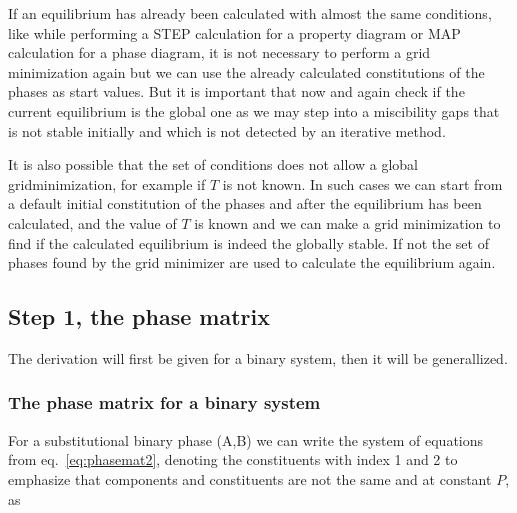 \documentclass[12pt]{article}
\begin{document}
If an equilibrium has already been calculated with almost the same
conditions, like while performing a STEP calculation for a property
diagram or MAP calculation for a phase diagram, it is not necessary to
perform a grid minimization again but we can use the already
calculated constitutions of the phases as start values.  But it is
important that now and again check if the current equilibrium is the
global one as we may step into a miscibility gaps that is not stable
initially and which is not detected by an iterative method.

It is also possible that the set of conditions does not allow a global
gridminimization, for example if $T$ is not known.  In such cases we
can start from a default initial constitution of the phases and after
the equilibrium has been calculated, and the value of $T$ is known and
we can make a grid minimization to find if the calculated equilibrium
is indeed the globally stable.  If not the set of phases found by the
grid minimizer are used to calculate the equilibrium again.

\subsection{Step 1, the phase matrix}

The derivation will first be given for a binary system, then it will
be generallized.

\subsubsection{The phase matrix for a binary system}

For a substitutional binary phase (A,B) we can write the system of
equations from eq.~\ref{eq:phasemat2}, denoting the constituents
with index 1 and 2 to emphasize that components and constituents
are not the same and at constant $P$, as

\label{eq:phasematrix2}
\end{document}
